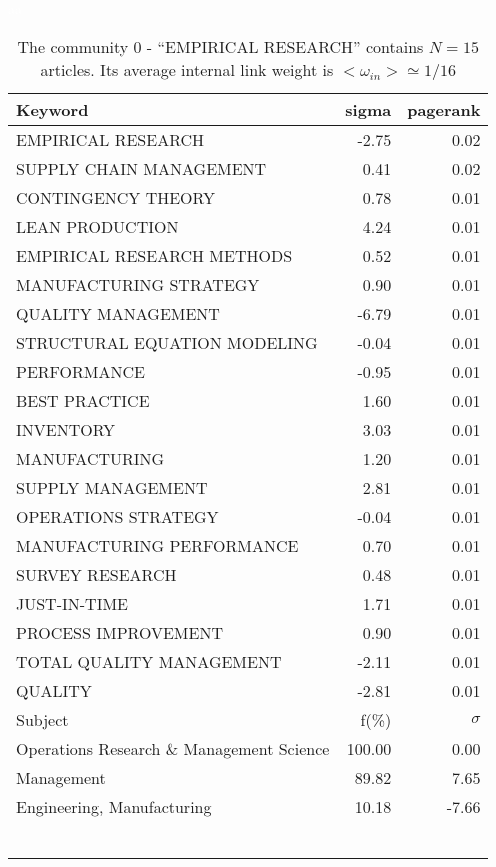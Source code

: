 \documentclass[a4paper,11pt]{report}
\begin{document}
\begin{landscape}
\clearpage

\begin{table}[!ht]
\caption{The community 0 - ``EMPIRICAL RESEARCH'' contains $N = 15$ articles. Its average internal link weight is $<\omega_{in}> \simeq 1/16$ }
\textcolor{white}{aa}\\
{\scriptsize\begin{tabular}{|l r  r|}
\hline
Keyword & sigma & pagerank \\
\hline
EMPIRICAL RESEARCH & -2.75 & 0.02\\
SUPPLY CHAIN MANAGEMENT & 0.41 & 0.02\\
CONTINGENCY THEORY & 0.78 & 0.01\\
LEAN PRODUCTION & 4.24 & 0.01\\
EMPIRICAL RESEARCH METHODS & 0.52 & 0.01\\
MANUFACTURING STRATEGY & 0.90 & 0.01\\
QUALITY MANAGEMENT & -6.79 & 0.01\\
STRUCTURAL EQUATION MODELING & -0.04 & 0.01\\
PERFORMANCE & -0.95 & 0.01\\
BEST PRACTICE & 1.60 & 0.01\\
INVENTORY & 3.03 & 0.01\\
MANUFACTURING & 1.20 & 0.01\\
SUPPLY MANAGEMENT & 2.81 & 0.01\\
OPERATIONS STRATEGY & -0.04 & 0.01\\
MANUFACTURING PERFORMANCE & 0.70 & 0.01\\
SURVEY RESEARCH & 0.48 & 0.01\\
JUST-IN-TIME & 1.71 & 0.01\\
PROCESS IMPROVEMENT & 0.90 & 0.01\\
TOTAL QUALITY MANAGEMENT & -2.11 & 0.01\\
QUALITY & -2.81 & 0.01\\
\hline
\hline
Subject & f(\%) & $\sigma$\\
\hline
Operations Research \& Management Science & 100.00 & 0.00\\
Management & 89.82 & 7.65\\
Engineering, Manufacturing & 10.18 & -7.66\\
 &  & \\
 &  & \\
 &  & \\
 &  & \\
 &  & \\
 &  & \\

\end{tabular}}
\end{table}
\end{landscape}
\end{document}
